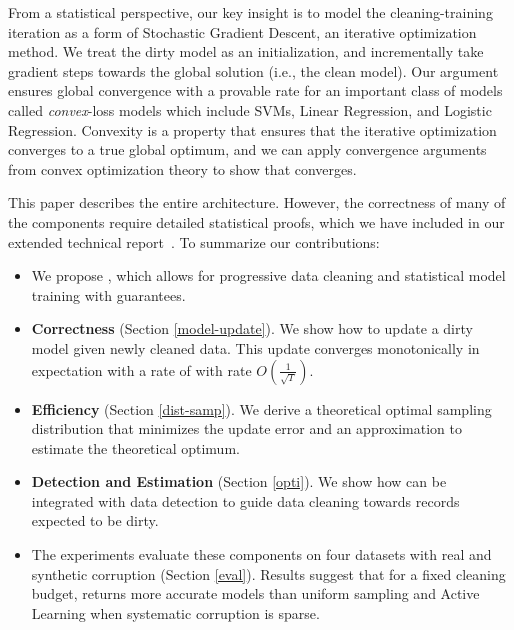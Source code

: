 From a statistical perspective, our key insight is to model the cleaning-training iteration as a form of Stochastic Gradient Descent, an iterative optimization method.
We treat the dirty model as an initialization, and incrementally take gradient steps towards the global solution (i.e., the clean model).
Our argument ensures global convergence with a provable rate for an important class of models called \emph{convex}-loss models which include SVMs, Linear Regression, and Logistic Regression.
Convexity is a property that ensures that the iterative optimization converges to a true global optimum, and we can apply convergence arguments from convex optimization theory to show that \sys converges.

This paper describes the entire \sys architecture. However, the correctness of many of the components require detailed statistical proofs, which we have included in our extended technical report~\cite{activecleanarxiv}. To summarize our contributions:
\begin{itemize}[noitemsep]
\item We propose \sys, which allows for progressive data cleaning and statistical model training with guarantees.
\item \textbf{Correctness} (Section \ref{model-update}). We show how to update a dirty model given newly cleaned data. This update converges monotonically in expectation with a rate of with rate $O(\frac{1}{\sqrt{T}})$.
\item \textbf{Efficiency} (Section \ref{dist-samp}). We derive a theoretical optimal sampling distribution that minimizes the update error and an approximation to estimate the theoretical optimum.
\item \textbf{Detection and Estimation} (Section \ref{opti}). We show how \sys can be integrated with data detection to guide data cleaning towards records expected to be dirty.
\item The experiments evaluate these components on four datasets with real and synthetic corruption (Section \ref{eval}). Results suggest that for a fixed cleaning budget, \sys returns more accurate models than uniform sampling and Active Learning when systematic corruption is sparse.

\end{itemize}






